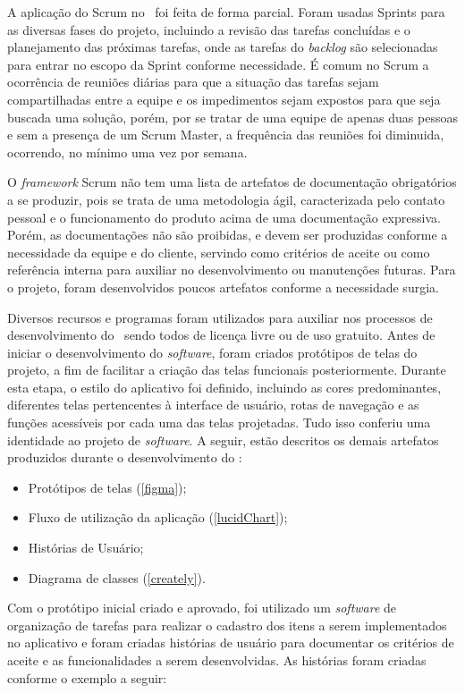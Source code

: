 A aplicação do Scrum no \appName\ foi feita de forma parcial. Foram usadas Sprints para as diversas fases do projeto, incluindo a revisão das tarefas concluídas e o planejamento das próximas tarefas, onde as tarefas do \textit{backlog} são selecionadas para entrar no escopo da Sprint conforme necessidade. É comum no Scrum a ocorrência de reuniões diárias para que a situação das tarefas sejam compartilhadas entre a equipe e os impedimentos sejam expostos para que seja buscada uma solução, porém, por se tratar de uma equipe de apenas duas pessoas e sem a presença de um Scrum Master, a frequência das reuniões foi diminuida, ocorrendo, no mínimo uma vez por semana.

O \textit{framework} Scrum não tem uma lista de artefatos de documentação obrigatórios a se produzir, pois se trata de uma metodologia ágil, caracterizada pelo contato pessoal e o funcionamento do produto acima de uma documentação expressiva. Porém, as documentações não são proibidas, e devem ser produzidas conforme a necessidade da equipe e do cliente, servindo como critérios de aceite ou como referência interna para auxiliar no desenvolvimento ou manutenções futuras. Para o projeto, foram desenvolvidos poucos artefatos conforme a necessidade surgia.

Diversos recursos e programas foram utilizados para auxiliar nos processos de desenvolvimento do \appName\, sendo todos de licença livre ou de uso gratuito. Antes de iniciar o desenvolvimento do \textit{software}, foram criados protótipos de telas do projeto, a fim de facilitar a criação das telas funcionais posteriormente. Durante esta etapa, o estilo do aplicativo foi definido, incluindo as cores predominantes, diferentes telas pertencentes à interface de usuário, rotas de navegação e as funções acessíveis por cada uma das telas projetadas. Tudo isso conferiu uma identidade ao projeto de \textit{software}. A seguir, estão descritos os demais artefatos produzidos durante o desenvolvimento do \appName:

\begin{itemize}
    \item Protótipos de telas (\ref{figma});
    \item Fluxo de utilização da aplicação (\ref{lucidChart});
    \item Histórias de Usuário;
    \item Diagrama de classes (\ref{creately}).
\end{itemize}

Com o protótipo inicial criado e aprovado, foi utilizado um \textit{software} de organização de tarefas para realizar o cadastro dos itens a serem implementados no aplicativo e foram criadas histórias de usuário para documentar os critérios de aceite e as funcionalidades a serem desenvolvidas. As histórias foram criadas conforme o exemplo a seguir:


